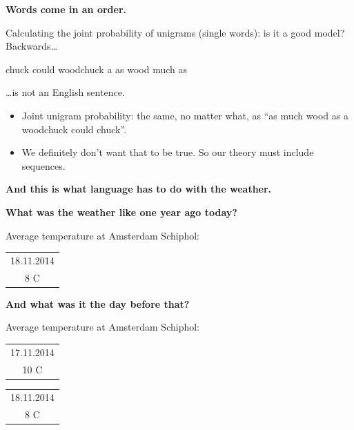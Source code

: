 \documentclass{beamer}
\newcommand{\placard}[1]{
  \begin{frame}
    \begin{center}
      \huge
      \textbf{#1}
    \end{center}
  \end{frame}
}
\newcommand{\pagestepalt}[2]{
  \begin{frame}[t]
    \begin{minipage}[t][0.26\textheight][t]{\textwidth}
      \begin{center}
        \huge
        \textbf{#1}
      \end{center}
    \end{minipage}
    
    \begin{minipage}[t][0.7\textheight][t]{\textwidth}
      #2
    \end{minipage}
  \end{frame}
}
\begin{document}
\pagestepalt{Words come in an order.}{
  Calculating the joint probability of \alert{unigrams} (single words):
  is it a good \alert{model}?\pause \\
  Backwards\ldots
  \begin{center}
    \Large chuck could woodchuck a as wood much as
  \end{center}
  \ldots is not an English sentence. \pause
  \begin{itemize}
  \item Joint unigram probability: the same, no matter what, as ``as much wood as a woodchuck could chuck''.\pause
  \item We definitely don't want that to be true.  So our theory must include
    sequences.
  \end{itemize}
}

\placard{And this is what language has to do with the weather.}

\pagestepalt{What was the weather like one year ago today?}{
  Average temperature at Amsterdam Schiphol:\\
  \begin{flushright}
    \begin{tabular}{|c|}
      \hline
      18.11.2014 \\
      {\Huge 8 C} \\
      \hline
   \end{tabular}
  \end{flushright}
}

\pagestepalt{And what was it the day before that?}{
  Average temperature at Amsterdam Schiphol:\\
  \begin{flushright}
    \begin{tabular}{|c|}
      \hline
      17.11.2014 \\
      {\Huge 10 C} \\
      \hline
    \end{tabular}
    \begin{tabular}{|c|}
      \hline
      18.11.2014 \\
      {\Huge 8 C} \\
      \hline
    \end{tabular}
  \end{flushright}
}
\end{document}
